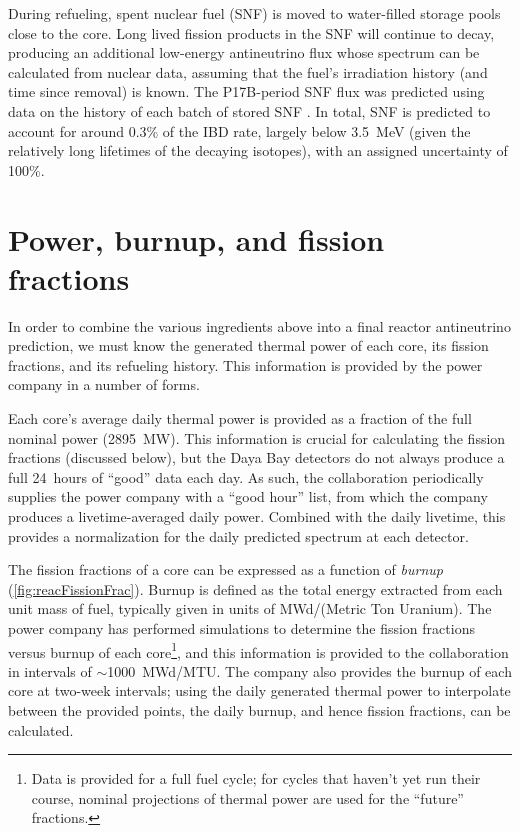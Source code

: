 \documentclass[../thesis.tex]{subfiles}
\begin{document}
During refueling, spent nuclear fuel (SNF) is moved to water-filled storage pools close to the core. Long lived fission products in the SNF will continue to decay, producing an additional low-energy antineutrino flux whose spectrum can be calculated from nuclear data, assuming that the fuel's irradiation history (and time since removal) is known. The P17B-period SNF flux was predicted using data on the history of each batch of stored SNF \cite{p17bSnf}. In total, SNF is predicted to account for around 0.3\% of the IBD rate, largely below 3.5~MeV (given the relatively long lifetimes of the decaying isotopes), with an assigned uncertainty of 100\%.

\section{Power, burnup, and fission fractions}
\label{sec:reacpow}

In order to combine the various ingredients above into a final reactor antineutrino prediction, we must know the generated thermal power of each core, its fission fractions, and its refueling history. This information is provided by the power company in a number of forms.

Each core's average daily thermal power is provided as a fraction of the full nominal power (2895~MW). This information is crucial for calculating the fission fractions (discussed below), but the Daya Bay detectors do not always produce a full 24~hours of ``good'' data each day. As such, the collaboration periodically supplies the power company with a ``good hour'' list, from which the company produces a livetime-averaged daily power. Combined with the daily livetime, this provides a normalization for the daily predicted spectrum at each detector.

The fission fractions of a core can be expressed as a function of \emph{burnup} (\autoref{fig:reacFissionFrac}). Burnup is defined as the total energy extracted from each unit mass of fuel, typically given in units of MWd/(Metric Ton Uranium). The power company has performed simulations to determine the fission fractions versus burnup of each core\footnote{Data is provided for a full fuel cycle; for cycles that haven't yet run their course, nominal projections of thermal power are used for the ``future'' fractions.}, and this information is provided to the collaboration in intervals of $\sim$1000~MWd/MTU. The company also provides the burnup of each core at two-week intervals; using the daily generated thermal power to interpolate between the provided points, the daily burnup, and hence fission fractions, can be calculated.
\end{document}
